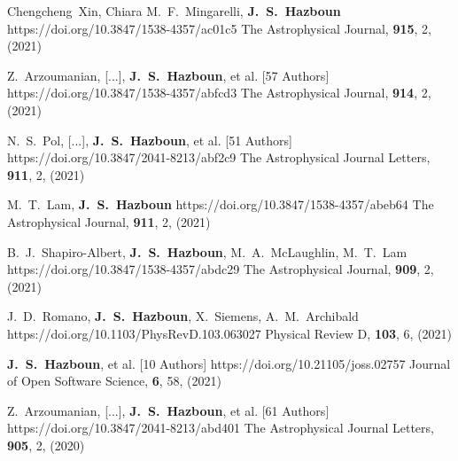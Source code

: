          {Chengcheng~{Xin}, Chiara M.~F.~{Mingarelli}, \textbf{J.~S.~Hazboun}}
         {https://doi.org/10.3847/1538-4357/ac01c5}
         {{The Astrophysical Journal}, \textbf{915}, 2, (2021)}

         {Z.~{Arzoumanian}, [...], \textbf{J.~S.~{Hazboun}}, et al. [57 Authors]}
         {https://doi.org/10.3847/1538-4357/abfcd3}
         {{The Astrophysical Journal}, \textbf{914}, 2, (2021)}

         {N.~S.~{Pol}, [...], \textbf{J.~S.~{Hazboun}}, et al. [51 Authors]}
         {https://doi.org/10.3847/2041-8213/abf2c9}
         {{The Astrophysical Journal Letters}, \textbf{911}, 2, (2021)}

         {M.~T.~{Lam}, \textbf{J.~S.~Hazboun}}
         {https://doi.org/10.3847/1538-4357/abeb64}
         {{The Astrophysical Journal}, \textbf{911}, 2, (2021)}

         {B.~J.~Shapiro-Albert, \textbf{J.~S.~Hazboun}, M.~A.~{McLaughlin}, M.~T.~{Lam}}
         {https://doi.org/10.3847/1538-4357/abdc29}
         {{The Astrophysical Journal}, \textbf{909}, 2, (2021)}

         {J.~D.~{Romano}, \textbf{J.~S.~Hazboun}, X.~{Siemens}, A.~M.~{Archibald}}
         {https://doi.org/10.1103/PhysRevD.103.063027}
         {{Physical Review D}, \textbf{103}, 6, (2021)}

         {\textbf{J.~S.~{Hazboun}}, et al. [10 Authors]}
         {https://doi.org/10.21105/joss.02757}
         {{Journal of Open Software Science}, \textbf{6}, 58, (2021)}

         {Z.~{Arzoumanian}, [...], \textbf{J.~S.~{Hazboun}}, et al. [61 Authors]}
         {https://doi.org/10.3847/2041-8213/abd401}
         {{The Astrophysical Journal Letters}, \textbf{905}, 2, (2020)}

